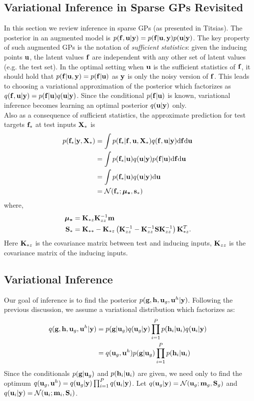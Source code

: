 \documentclass{article} %
\begin{document}
\subsection{Variational Inference in Sparse GPs Revisited}
In this section we review inference in sparse GPs (as presented in Titsias).
The posterior in an augmented model is $p(\mathbf{f}, \mathbf{u} | \mathbf{y}) = p(\mathbf{f} | \mathbf{u}, \mathbf{y}) p(\mathbf{u} | \mathbf{y})$.
The key property of such augmented GPs  is the notation of \textit{sufficient statistics}: given the inducing points $\mathbf{u}$, the latent values $\mathbf{f}$ are independent with any other set of latent values (e.g. the test set).
In the optimal setting when $\mathbf{u}$ is the sufficient statistics of $\mathbf{f}$, it should hold that $p(\mathbf{f} | \mathbf{u}, \mathbf{y}) = p(\mathbf{f} | \mathbf{u})$ as $\mathbf{y}$ is only the noisy version of $\mathbf{f}$.
This leads to choosing a variational approximation of the posterior which factorizes as $q(\mathbf{f}, \mathbf{u} | \mathbf{y}) = p(\mathbf{f} | \mathbf{u}) q(\mathbf{u} | \mathbf{y})$.
Since the conditional $p(\mathbf{f} | \mathbf{u})$ is known, variational inference becomes learning an optimal posterior $q(\mathbf{u} | \mathbf{y})$ only. \\

\noindent Also as a consequence of sufficient statistics, the approximate prediction for test targets $\mathbf{f}_*$ at test inputs $\mathbf{X}_*$ is
\begin{align}
\nonumber
p(\mathbf{f}_* | \mathbf{y}, \mathbf{X}_*) &= \int p(\mathbf{f}_* | \mathbf{f}, \mathbf{u}, \mathbf{X}_*) q(\mathbf{f}, \mathbf{u} | \mathbf{y}) \mathrm{d} \mathbf{f} \mathrm{d} \mathbf{u} \\
\nonumber
&= \int p(\mathbf{f}_* | \mathbf{u}) q(\mathbf{u}| \mathbf{y}) p(\mathbf{f} | \mathbf{u}) \mathrm{d} \mathbf{f} \mathrm{d} \mathbf{u} \\ \nonumber
&= \int p(\mathbf{f}_* | \mathbf{u}) q(\mathbf{u}| \mathbf{y}) \mathrm{d} \mathbf{u} \\
\label{eq:sorprediction}
&= \mathcal{N}(\mathbf{f}_*; \boldsymbol{\mu_*},\mathbf{s_*})
\end{align}
where,
\begin{align}
\nonumber
\boldsymbol{\mu_*} &= \mathbf{K}_{*z} \mathbf{K}_{zz}^{-1}\mathbf{m} \\ 
\nonumber
\mathbf{S}_* &= \mathbf{K}_{**} - \mathbf{K}_{*z} \left(\mathbf{K}_{zz}^{-1} - \mathbf{K}_{zz}^{-1} \mathbf{S} \mathbf{K}_{zz}^{-1} \right) \mathbf{K}_{*z}^T.
\end{align}
 Here $\mathbf{K}_{*z}$ is the covariance matrix between test and inducing inputs, $\mathbf{K}_{zz}$ is the covariance matrix of the inducing inputs.

\subsection{Variational Inference}
\newcommand{\ug}{\u_g}
\newcommand{\uh}{\u^h}
Our goal of inference is to find the posterior $p(\g, \h, \ug, \uh | \y)$. 
Following the previous discussion, we assume a variational distribution which factorizes as:
\begin{align}
\nonumber
q(\g, \h, \ug, \uh | \y)
 &= p(\g | \ug) q(\ug | \y) \prod_{i=1}^P p(\h_i | \u_i) q(\u_i | \y) \\
 &=  q(\ug, \uh) p(\g | \ug) \prod_{i=1}^P p(\h_i | \u_i)
\end{align}
Since the conditionals $p(\g | \ug)$ and $p(\mathbf{h}_i | \mathbf{u}_i)$ are given, we need only to find the optimum $q(\ug, \uh) = q(\ug | \y) \prod_{i=1}^P q(\u_i | \y)$.
Let $q(\ug | \y) = \Normal(\ug; \m_g, \S_g)$ and $q(\mathbf{u}_i | \mathbf{y}) = \mathcal{N}(\mathbf{u}_i; \mathbf{m}_i, \mathbf{S}_i)$. \\
\end{document}
